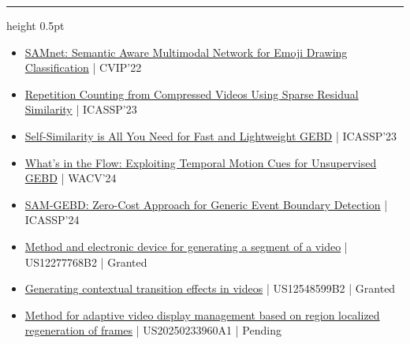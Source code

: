 \documentclass[letterpaper]{article}
\newcommand{\ressection}[1]{\par\vspace{3pt}{\fontsize{9}{10}\selectfont\bfseries #1}\par\vspace{1pt}\hrule height 0.5pt\vspace{1.25pt}}
\begin{document}
\ressection{RESEARCH PAPERS \& PATENTS}
\begin{itemize}[noitemsep]
\item \href{https://link.springer.com/chapter/10.1007/978-3-031-31417-9_10}{SAMnet: Semantic Aware Multimodal Network for Emoji Drawing Classification} {| CVIP'22}
\item \href{https://ieeexplore.ieee.org/abstract/document/10094742?casa_token=O1-jkGt_pP4AAAAA:2tRJlPsqdO62ZlhCQ_XRwfh1r-D2Y9ZheEcys1A08NI1-bq0TG-_sUkKudxL2yKUovyFPyimhO4G}{Repetition Counting from Compressed Videos Using Sparse Residual Similarity} {| ICASSP'23}
\item \href{https://ieeexplore.ieee.org/abstract/document/10096176?casa_token=bGsSrvFJIw4AAAAA:Z-TvjRt6uOGOct_FusaKao7iSXYwCRpNy7JHz2bVOznAhVvK-6mSYgwCA7pZzH8e7iLypo1Ife44}{Self-Similarity is All You Need for Fast and Lightweight GEBD} {| ICASSP'23}
\item \href{https://openaccess.thecvf.com/content/WACV2024/papers/Gothe_Whats_in_the_Flow_Exploiting_Temporal_Motion_Cues_for_Unsupervised_WACV_2024_paper.pdf}{What's in the Flow: Exploiting Temporal Motion Cues for Unsupervised GEBD} {| WACV'24}
\item \href{https://ieeexplore.ieee.org/abstract/document/10447789?casa_token=zJbDCbfluQcAAAAA:trUo4xo6bc4uOfRRGFNpRhLSExfOGtp4T2BheVAIh34xaxtSrn09gNIOjMCCmibKHqYV1Bzu7yU}{SAM-GEBD: Zero-Cost Approach for Generic Event Boundary Detection} {| ICASSP'24}
\item \href{https://patents.google.com/patent/US12277768B2/en}{Method and electronic device for generating a segment of a video} {| US12277768B2 | Granted}
\item \href{https://patents.google.com/patent/US12548599B2/en}{Generating contextual transition effects in videos} {| US12548599B2 | Granted}
\item \href{https://patents.google.com/patent/US20250233960A1/en}{Method for adaptive video display management based on region localized regeneration of frames} {| US20250233960A1 | Pending}
\end{itemize}
\end{document}
